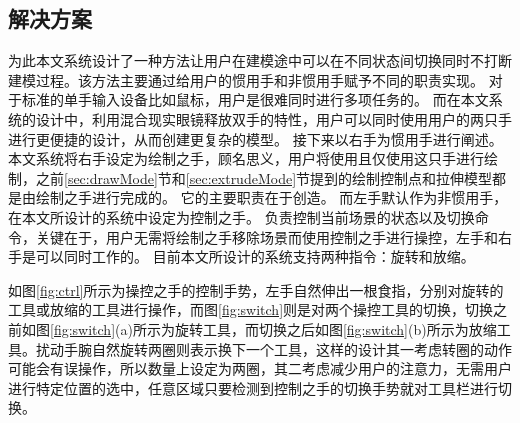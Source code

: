 \subsection{解决方案}

为此本文系统设计了一种方法让用户在建模途中可以在不同状态间切换同时不打断建模过程。该方法主要通过给用户的惯用手和非惯用手赋予不同的职责实现。
对于标准的单手输入设备比如鼠标，用户是很难同时进行多项任务的。
而在本文系统的设计中，利用混合现实眼镜释放双手的特性，用户可以同时使用用户的两只手进行更便捷的设计，从而创建更复杂的模型。
接下来以右手为惯用手进行阐述。
本文系统将右手设定为绘制之手，顾名思义，用户将使用且仅使用这只手进行绘制，之前\ref{sec:drawMode}节和\ref{sec:extrudeMode}节提到的绘制控制点和拉伸模型都是由绘制之手进行完成的。
它的主要职责在于创造。
而左手默认作为非惯用手，在本文所设计的系统中设定为控制之手。
负责控制当前场景的状态以及切换命令，关键在于，用户无需将绘制之手移除场景而使用控制之手进行操控，左手和右手是可以同时工作的。
目前本文所设计的系统支持两种指令：旋转和放缩。

\begin{figure}[!htp]
  \centering
	\subfigure{\label{fig:ctrl:1}}\addtocounter{subfigure}{-2}
	\subfigure{\label{fig:ctrl:2}}\addtocounter{subfigure}{-2}
\end{figure}
如图\ref{fig:ctrl}所示为操控之手的控制手势，左手自然伸出一根食指，分别对旋转的工具或放缩的工具进行操作，而图\ref{fig:switch}则是对两个操控工具的切换，切换之前如图\ref{fig:switch}(a)所示为旋转工具，而切换之后如图\ref{fig:switch}(b)所示为放缩工具。扰动手腕自然旋转两圈则表示换下一个工具，这样的设计其一考虑转圈的动作可能会有误操作，所以数量上设定为两圈，其二考虑减少用户的注意力，无需用户进行特定位置的选中，任意区域只要检测到控制之手的切换手势就对工具栏进行切换。
\begin{figure}[!htp]
  \centering
  \subfigure{\label{fig:switch:1}}\addtocounter{subfigure}{-2}
	\subfigure{\label{fig:switch:2}}\addtocounter{subfigure}{-2}
\end{figure}

